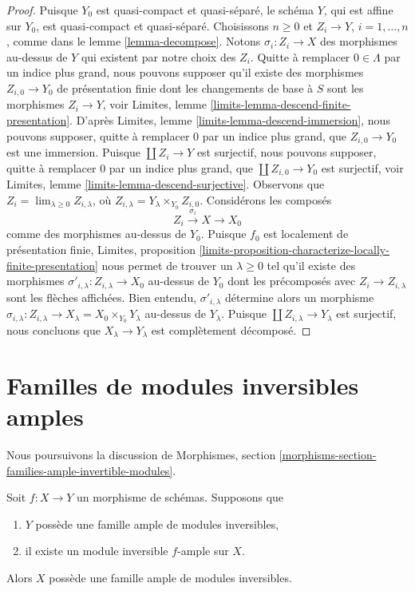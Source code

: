 \begin{proof}
Puisque $Y_0$ est quasi-compact et quasi-séparé, le schéma $Y$,
qui est affine sur $Y_0$, est quasi-compact et quasi-séparé.
Choisissons $n \geq 0$ et $Z_i \to Y$, $i = 1, \ldots, n$, comme dans le
lemme \ref{lemma-decompose}. Notons $\sigma_i : Z_i \to X$
des morphismes au-dessus de $Y$ qui existent par notre choix des $Z_i$.
Quitte à remplacer $0 \in \Lambda$ par un indice plus grand, nous pouvons supposer qu'il existe
des morphismes $Z_{i, 0} \to Y_0$ de présentation finie
dont les changements de base à $S$ sont les morphismes $Z_i \to Y$, voir
Limites, lemme \ref{limits-lemma-descend-finite-presentation}.
D'après Limites, lemme \ref{limits-lemma-descend-immersion},
nous pouvons supposer, quitte à remplacer $0$ par un indice plus grand, que $Z_{i, 0} \to Y_0$
est une immersion. Puisque $\coprod Z_i \to Y$ est surjectif, nous pouvons supposer,
quitte à remplacer $0$ par un indice plus grand, que
$\coprod Z_{i, 0} \to Y_0$ est surjectif, voir
Limites, lemme \ref{limits-lemma-descend-surjective}. Observons que
$Z_i = \lim_{\lambda \geq 0} Z_{i, \lambda}$,
où $Z_{i, \lambda} = Y_\lambda \times_{Y_0} Z_{i, 0}$.
Considérons les composés
$$
Z_i \xrightarrow{\sigma_i} X \to X_0
$$
comme des morphismes au-dessus de $Y_0$. Puisque $f_0$ est localement de présentation
finie, Limites, proposition
\ref{limits-proposition-characterize-locally-finite-presentation}
nous permet de trouver un $\lambda \geq 0$ tel qu'il existe des
morphismes $\sigma'_{i, \lambda} : Z_{i, \lambda} \to X_0$
au-dessus de $Y_0$ dont les précomposés avec $Z_i \to Z_{i, \lambda}$
sont les flèches affichées. Bien entendu, $\sigma'_{i, \lambda}$
détermine alors un morphisme $\sigma_{i, \lambda} : Z_{i, \lambda} \to
X_\lambda = X_0 \times_{Y_0} Y_\lambda$ au-dessus de $Y_\lambda$.
Puisque $\coprod Z_{i, \lambda} \to Y_\lambda$ est surjectif,
nous concluons que $X_\lambda \to Y_\lambda$ est complètement décomposé.
\end{proof}




\section{Familles de modules inversibles amples}
\label{section-families-ample-invertible-modules}

\noindent
Nous poursuivons la discussion de
Morphismes, section \ref{morphisms-section-families-ample-invertible-modules}.

\begin{lemma}
\label{lemma-ample-family-ample-relative}
Soit $f : X \to Y$ un morphisme de schémas. Supposons que
\begin{enumerate}
\item $Y$ possède une famille ample de modules inversibles,
\item il existe un module inversible $f$-ample sur $X$.
\end{enumerate}
Alors $X$ possède une famille ample de modules inversibles.
\end{lemma}

